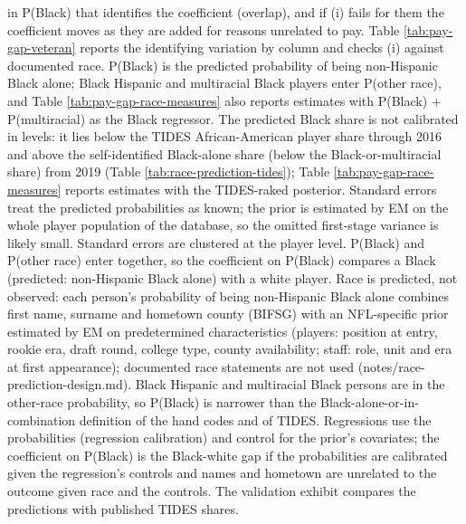 {in P(Black) that identifies the coefficient (overlap), and if (i) fails for them the coefficient moves as they are added for reasons unrelated to pay. Table \ref{tab:pay-gap-veteran} reports the identifying variation by column and checks (i) against documented race. P(Black) is the predicted probability of being non-Hispanic Black alone; Black Hispanic and multiracial Black players enter P(other race), and Table \ref{tab:pay-gap-race-measures} also reports estimates with P(Black) + P(multiracial) as the Black regressor. The predicted Black share is not calibrated in levels: it lies below the TIDES African-American player share through 2016 and above the self-identified Black-alone share (below the Black-or-multiracial share) from 2019 (Table \ref{tab:race-prediction-tides}); Table \ref{tab:pay-gap-race-measures} reports estimates with the TIDES-raked posterior. Standard errors treat the predicted probabilities as known; the prior is estimated by EM on the whole player population of the database, so the omitted first-stage variance is likely small. Standard errors are clustered at the player level. P(Black) and P(other race) enter together, so the coefficient on P(Black) compares a Black (predicted: non-Hispanic Black alone) with a white player. Race is predicted, not observed: each person's probability of being non-Hispanic Black alone combines first name, surname and hometown county (BIFSG) with an NFL-specific prior estimated by EM on predetermined characteristics (players: position at entry, rookie era, draft round, college type, county availability; staff: role, unit and era at first appearance); documented race statements are not used (notes/race-prediction-design.md). Black Hispanic and multiracial Black persons are in the other-race probability, so P(Black) is narrower than the Black-alone-or-in-combination definition of the hand codes and of TIDES. Regressions use the probabilities (regression calibration) and control for the prior's covariates; the coefficient on P(Black) is the Black-white gap if the probabilities are calibrated given the regression's controls and names and hometown are unrelated to the outcome given race and the controls. The validation exhibit compares the predictions with published TIDES shares.
\par}

